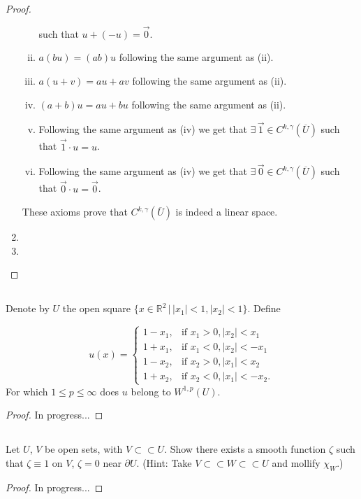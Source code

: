 \documentclass[11pt]{article}
\begin{document}
\begin{proof}
\begin{enumerate}[1.]
\begin{enumerate}[(i)]
					such that $u+(-u) = \vec{0}$.
				\item $a(bu) = (ab)u$ following the same argument as (ii).
				\item $a(u + v) = au + av$ following the same argument as (ii).
				\item $(a+b)u = au + bu$ following the same argument as (ii).
				\item Following the same argument as (iv) we get that $\exists \, \vec{1} \in C^{k,\gamma}(\overline{U})$
					such that $\vec{1} \cdot u = u$.
				\item Following the same argument as (iv) we get that $\exists \, \vec{0} \in C^{k,\gamma}(\overline{U})$
					such that $\vec{0} \cdot u = \vec{0}$.
			\end{enumerate}
			These axioms prove that $C^{k,\gamma}(\overline{U})$ is indeed a linear space.
		\newpage
		\item 
		\item
	\end{enumerate}
\end{proof}

\newpage

\setcounter{subsection}{2}
\subsection{}
Denote by $U$ the open square $\{x \in \mathbb{R}^2 \, | \, |x_1| < 1, |x_2| < 1\}$. Define

\[
u(x) =
\begin{cases} 
	1 - x_1, & \text{if } x_1 > 0, |x_2| < x_1 \\
	1 + x_1, & \text{if } x_1 < 0, |x_2| < -x_1 \\
	1 - x_2, & \text{if } x_2 > 0, |x_1| < x_2 \\
	1 + x_2, & \text{if } x_2 < 0, |x_1| < -x_2.
\end{cases}
\]
For which $1 \leq p \leq \infty$ does $u$ belong to $W^{1,p}(U)$.
\begin{proof}
In progress...
\end{proof}

\setcounter{subsection}{4}
\subsection{}
Let $U$, $V$ be open sets, with $V\subset\subset U$. Show there exists a smooth function $\zeta$ such that
$\zeta \equiv 1$ on $V$, $\zeta = 0$ near $\partial U$. (Hint: Take $V \subset\subset W \subset\subset U$ and mollify $\chi_W$.)
\begin{proof}
In progress...
\end{proof}
\end{document}

